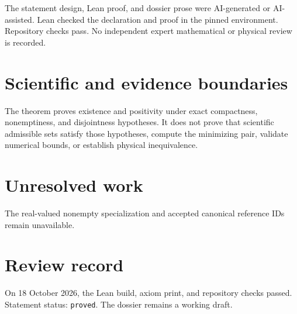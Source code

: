 \documentclass[11pt]{article}
\begin{document}
The statement design, Lean proof, and dossier prose were AI-generated or AI-assisted.
Lean checked the declaration and proof in the pinned environment. Repository checks pass.
No independent expert mathematical or physical review is recorded.

\section{Scientific and evidence boundaries}

The theorem proves existence and positivity under exact compactness, nonemptiness, and
disjointness hypotheses. It does not prove that scientific admissible sets satisfy those
hypotheses, compute the minimizing pair, validate numerical bounds, or establish physical
inequivalence.

\section{Unresolved work}

The real-valued nonempty specialization and accepted canonical reference IDs remain
unavailable.

\section{Review record}

On 18 October 2026, the Lean build, axiom print, and repository checks passed. Statement
status: \texttt{proved}. The dossier remains a working draft.
\end{document}
